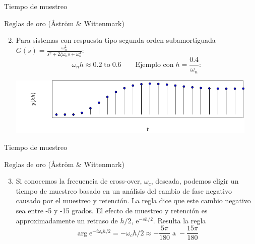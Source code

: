 \documentclass[presentation,aspectratio=169]{beamer}
\begin{document}
\begin{frame}[label={sec:org1208383}]{Tiempo de muestreo}
\begin{block}{Reglas de oro (Åström \& Wittenmark)}
\begin{enumerate}
\setcounter{enumi}{1}
\item Para sistemas con respuesta tipo segunda orden subamortiguada \(G(s) = \frac{\omega_n^2}{s^2 + 2\zeta\omega_n s + \omega_n^2}:\) 
\[ \omega_n h \approx 0.2 \; \text{to} \; 0.6 \qquad \text{Ejemplo con}\; h = \frac{0.4}{\omega_n}:\]

\begin{center}
\includegraphics[width=12cm]{second-order-response-example}
\end{center}
\end{enumerate}
\end{block}
\end{frame}
\begin{frame}[label={sec:orgda8ae03}]{Tiempo de muestreo}
\begin{block}{Reglas de oro (Åström \& Wittenmark)}
\begin{enumerate}
\setcounter{enumi}{2}
\item Si conocemos la frecuencia de cross-over, \(\omega_c\), deseada, podemos eligir un tiempo de muestreo basado en un análisis del cambio de fase negativo causado por el muestreo y retención. La regla dice que este cambio negativo sea entre -5 y -15 grados. El efecto de muestreo y retención es approximadamente un retraso de \(h/2\), \(\mathrm{e}^{-sh/2}\). Resulta la regla
\[ \arg \mathrm{e}^{-i\omega_c h/2} = -\omega_c h/2 \approx -\frac{5\pi}{180} \; \text{a} \; -\frac{15\pi}{180}\]
\end{enumerate}
\end{block}
\end{frame}
\end{document}
